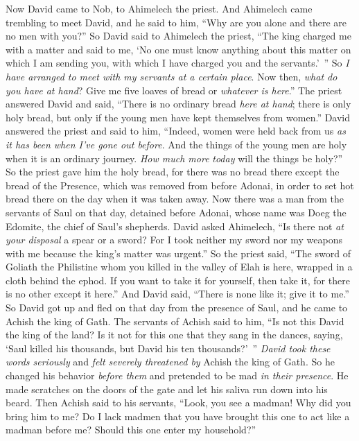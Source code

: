 \begin{biblechapter} %
 Now David came to Nob, to Ahimelech the priest. And Ahimelech came trembling to meet David, and he said to him, “Why are you alone and there are no men with you?”
\verse So David said to Ahimelech the priest, “The king charged me with a matter and said to me, ‘No one must know anything about this matter on which I am sending you, with which I have charged you and the servants.’ ” So \textit{I have arranged to meet with my servants at a certain place}.
\verse Now then, \textit{what do you have at hand}? Give me five loaves of bread or \textit{whatever is here}.”
\verse The priest answered David and said, “There is no ordinary bread \textit{here at hand}; there is only holy bread, but only if the young men have kept themselves from women.”
\verse David answered the priest and said to him, “Indeed, women were held back from us \textit{as it has been when I’ve gone out before}. And the things of the young men are holy when it is an ordinary journey. \textit{How much more} \textit{today} will the things be holy?”
\verse So the priest gave him the holy bread, for there was no bread there except the bread of the Presence, which was removed from before Adonai, in order to set hot bread there on the day when it was taken away.
\verse Now there was a man from the servants of Saul on that day, detained before Adonai, whose name was Doeg the Edomite, the chief of Saul’s shepherds.
\verse David asked Ahimelech, “Is there not \textit{at your disposal} a spear or a sword? For I took neither my sword nor my weapons with me because the king’s matter was urgent.”
\verse So the priest said, “The sword of Goliath the Philistine whom you killed in the valley of Elah is here, wrapped in a cloth behind the ephod. If you want to take it for yourself, then take it, for there is no other except it here.” And David said, “There is none like it; give it to me.”
 So David got up and fled on that day from the presence of Saul, and he came to Achish the king of Gath.
\verse The servants of Achish said to him, “Is not this David the king of the land? Is it not for this one that they sang in the dances, saying, ‘Saul killed his thousands, but David his ten thousands?’ ”
\verse \textit{David took these words seriously} and \textit{felt severely threatened by} Achish the king of Gath.
\verse So he changed his behavior \textit{before them} and pretended to be mad \textit{in their presence}. He made scratches on the doors of the gate and let his saliva run down into his beard.
\verse Then Achish said to his servants, “Look, you see a madman! Why did you bring him to me?
\verse Do I lack madmen that you have brought this one to act like a madman before me? Should this one enter my household?”
\end{biblechapter}

